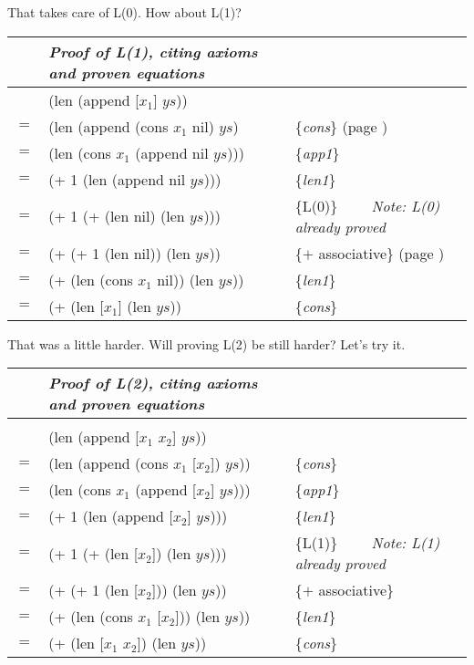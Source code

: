 That takes care of L(0). How about L(1)?
\begin{center}
\begin{tabular}{lll}
&\emph{Proof of L(1), citing axioms and proven equations}&\\
\hline
    & \textsf{(len (append [$x_1$] $ys$))}           &                     \\
$=$ & \textsf{(len (append (cons $x_1$ nil) $ys$)}   & \{\emph{cons}\} (page \pageref{first-rest-cons}) \\
$=$ & \textsf{(len (cons $x_1$ (append nil $ys$)))}  & \{\emph{app1}\}     \\
$=$ & \textsf{(+ 1 (len (append nil $ys$)))}         & \{\emph{len1}\}     \\
$=$ & \textsf{(+ 1 (+ (len nil) (len $ys$)))}        & \{L(0)\} ~~~~\emph{Note: L(0) already proved}\\
$=$ & \textsf{(+ (+ 1 (len nil)) (len $ys$))}        & \{$+$ associative\} (page \pageref{fig-02-01}) \\
$=$ & \textsf{(+ (len (cons $x_1$ nil)) (len $ys$))} & \{\emph{len1}\}     \\
$=$ & \textsf{(+ (len [$x_1$] (len $ys$))}           & \{\emph{cons}\}     \\
\end{tabular}
\end{center}
That was a little harder. Will proving L(2) be still harder? Let's try it.
\begin{center}
\begin{tabular}{lll}
&\emph{Proof of L(2), citing axioms and proven equations}&\\
\hline\\[-1.0em]
    & \textsf{(len (append [$x_1$ $x_2$] $ys$))}         &                     \\
$=$ & \textsf{(len (append (cons $x_1$ [$x_2$]) $ys$))}  & \{\emph{cons}\}     \\
$=$ & \textsf{(len (cons $x_1$ (append [$x_2$] $ys$)))}  & \{\emph{app1}\}     \\
$=$ & \textsf{(+ 1 (len (append [$x_2$] $ys$)))}         & \{\emph{len1}\}     \\
$=$ & \textsf{(+ 1 (+ (len [$x_2$]) (len $ys$)))}        & \{L(1)\} ~~~~\emph{Note: L(1) already proved}\\
$=$ & \textsf{(+ (+ 1 (len [$x_2$])) (len $ys$))}        & \{$+$ associative\} \\
$=$ & \textsf{(+ (len (cons $x_1$ [$x_2$])) (len $ys$))} & \{\emph{len1}\}     \\
$=$ & \textsf{(+ (len [$x_1$ $x_2$]) (len $ys$))}        & \{\emph{cons}\}     \\
\end{tabular}
\end{center}
